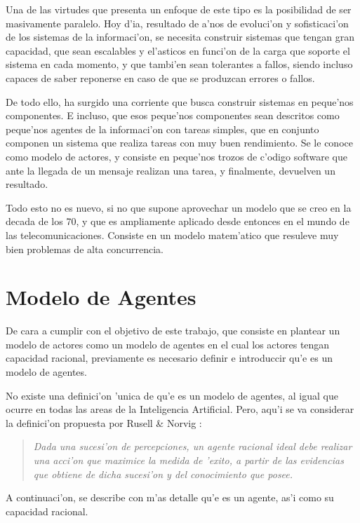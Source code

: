 \documentclass[12pt]{article}
\begin{document}
Una de las virtudes que presenta un enfoque de este tipo es la posibilidad de ser masivamente
paralelo. Hoy d'ia, resultado de a'nos de evoluci'on y sofisticaci'on de los sistemas de la informaci'on,
se necesita construir sistemas que tengan gran capacidad, que sean escalables y el'asticos
en funci'on de la carga que soporte el sistema en cada momento, y que tambi'en sean tolerantes
a fallos, siendo incluso capaces de saber reponerse en caso de que se produzcan errores o fallos.

De todo ello, ha surgido una corriente que busca construir sistemas en peque'nos componentes. E incluso,
que esos peque'nos componentes sean descritos como peque'nos agentes de la informaci'on con tareas simples,
que en conjunto componen un sistema que realiza tareas con muy buen rendimiento. Se le conoce como modelo de
actores, y consiste en peque'nos trozos de c'odigo software que ante la llegada de un mensaje realizan
una tarea, y finalmente, devuelven un resultado.

Todo esto no es nuevo, si no que supone aprovechar un modelo que se creo en la decada de los 70, y
que es ampliamente aplicado desde entonces en el mundo de las telecomunicaciones. Consiste en un
modelo matem'atico que resuleve muy bien problemas de alta concurrencia.

\section{Modelo de Agentes}
\label{sec:modelo de agentes}
De cara a cumplir con el objetivo de este trabajo, que consiste en plantear
un modelo de actores como un modelo de agentes en el cual los actores
tengan capacidad racional, previamente es necesario definir e introduccir qu'e es un
modelo de agentes.

No existe una definici'on 'unica de qu'e es un modelo de agentes, al igual que ocurre en
todas las areas de la Inteligencia Artificial. Pero, aqu'i se va considerar la definici'on
propuesta por Rusell \& Norvig \cite{AI-Russell&Norvig}:

\begin{quote}
\emph{Dada una sucesi'on de percepciones, un agente racional ideal debe realizar
una acci'on que maximice la medida de 'exito, a partir de las evidencias que obtiene
de dicha sucesi'on y del conocimiento que posee.}
\end{quote}

A continuaci'on, se describe con m'as detalle qu'e es un agente, as'i como su capacidad racional.
\end{document}
